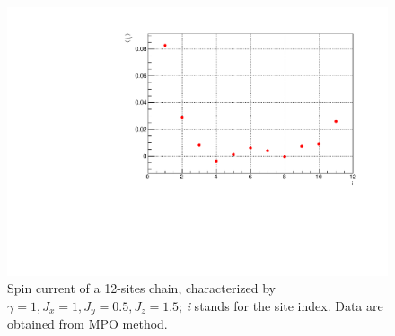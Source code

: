 \begin{figure}[H]
    \centering
    \includegraphics[scale=0.7]{Figures/12sites/SpinCurrL012m060Time002000_J10515.pdf}
    \caption{Spin current of a 12-sites chain, characterized by $\gamma=1, J_x=1, J_y=0.5, J_z=1.5$; \emph{i} stands for the site index. Data are obtained from MPO method.}
    \label{fig:my_label}
\end{figure}